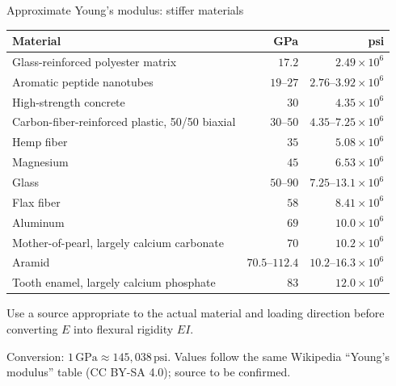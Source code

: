 \documentclass[aspectratio=169,11pt]{beamer}
\begin{document}
\begin{frame}{Approximate Young's modulus: stiffer materials}
\footnotesize
\setlength{\tabcolsep}{3pt}
\renewcommand{\arraystretch}{1.08}
\begin{center}
\begin{tabular}{@{}p{}rr@{}}
\toprule
Material & GPa & psi \\
\midrule
Glass-reinforced polyester matrix & $17.2$ & $2.49\times10^6$ \\
Aromatic peptide nanotubes & $19$--$27$ & $2.76$--$3.92\times10^6$ \\
High-strength concrete & $30$ & $4.35\times10^6$ \\
Carbon-fiber-reinforced plastic, 50/50 biaxial & $30$--$50$ & $4.35$--$7.25\times10^6$ \\
Hemp fiber & $35$ & $5.08\times10^6$ \\
Magnesium & $45$ & $6.53\times10^6$ \\
Glass & $50$--$90$ & $7.25$--$13.1\times10^6$ \\
Flax fiber & $58$ & $8.41\times10^6$ \\
Aluminum & $69$ & $10.0\times10^6$ \\
Mother-of-pearl, largely calcium carbonate & $70$ & $10.2\times10^6$ \\
Aramid & $70.5$--$112.4$ & $10.2$--$16.3\times10^6$ \\
Tooth enamel, largely calcium phosphate & $83$ & $12.0\times10^6$ \\
\bottomrule
\end{tabular}
\end{center}
\begin{punchbox}
\small Use a source appropriate to the actual material and loading direction before converting $E$ into flexural rigidity $EI$.
\end{punchbox}
{\tiny\color{DarkGray} Conversion: $1\,\mathrm{GPa}\approx145{,}038\,\mathrm{psi}$. Values follow the same Wikipedia ``Young's modulus'' table (CC BY-SA 4.0); source to be confirmed.\par}
\end{frame}
\end{document}
